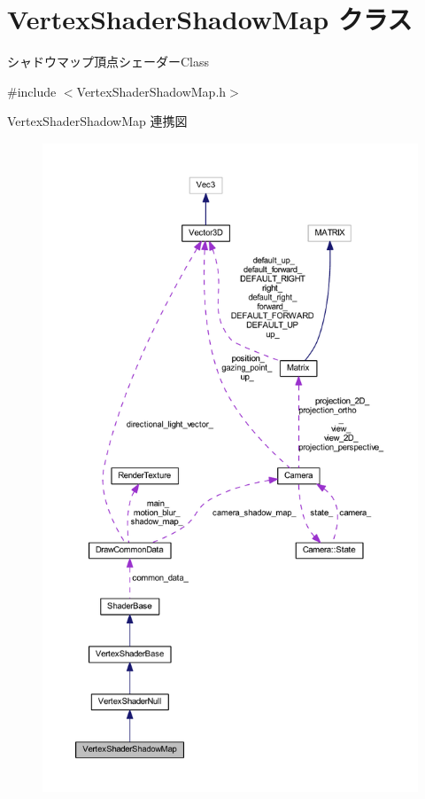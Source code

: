 \hypertarget{class_vertex_shader_shadow_map}{}\section{Vertex\+Shader\+Shadow\+Map クラス}
\label{class_vertex_shader_shadow_map}


シャドウマップ頂点シェーダー\+Class  




{\ttfamily \#include $<$Vertex\+Shader\+Shadow\+Map.\+h$>$}



Vertex\+Shader\+Shadow\+Map 連携図\nopagebreak
\begin{figure}[H]
\begin{center}
\leavevmode
\includegraphics[height=550pt]{class_vertex_shader_shadow_map__coll__graph}
\end{center}
\end{figure}
